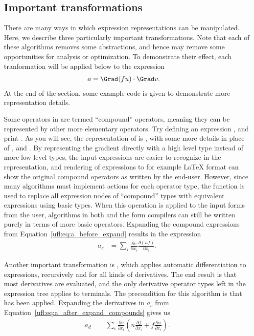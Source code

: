 \subsection{Important transformations} \label{ufl:sec:expanding}

There are many ways in which expression representations can be
manipulated.  Here, we describe three particularly important
transformations.  Note that each of these algorithms removes some
abstractions, and hence may remove some opportunities for analysis or
optimization. To demonstrate their effect, each tranformation will
be applied below to the expression
\begin{align} \label{ufl:eq:a_before_expand}
a   &= \Grad (f u) \cdot \Grad v.
\end{align}
At the end of the section, some example code is given to demonstrate
more representation details.

Some operators in \ufl{} are termed ``compound'' operators, meaning
they can be represented by other more elementary operators.  Try
defining an expression , and print
. As you will see, the representation of  is
, with some more details
in place of ,  and .
By representing the gradient directly with a high
level type  instead of more low level types, the input
expressions are easier to recognize in the representation, and
rendering of expressions to for example \LaTeX{} format can show the
original compound operators as written by the end-user.
However, since many algorithms must implement actions for each
operator type, the function  is used to
replace all expression nodes of ``compound'' types with equivalent
expressions using basic types. When this operation is applied to the
input forms from the user, algorithms in both \ufl{} and the form
compilers can still be written purely in terms of more basic operators.
Expanding the compound expressions from
Equation~\eqref{ufl:eq:a_before_expand} results in the expression
\begin{align} \label{ufl:eq:a_after_expand_compounds}
a_c &= \sum_i \frac{\partial v}{\partial x_i} \frac{\partial (u f)}{\partial x_i}.
\end{align}

Another important transformation is , which
applies automatic differentiation to expressions, recursively and for
all kinds of derivatives.  The end result is that most derivatives are
evaluated, and the only derivative operator types left in the
expression tree applies to terminals. The precondition for this
algorithm is that  has been applied.
Expanding the derivatives in $a_c$ from
Equation~\eqref{ufl:eq:a_after_expand_compounds} gives us
\begin{align} \label{ufl:eq:a_after_expand_derivatives}
a_d &= \sum_{i} \frac{\partial v}{\partial x_i} (u \frac{\partial f}{\partial x_i} + f \frac{\partial u}{\partial x_i}).
\end{align}

